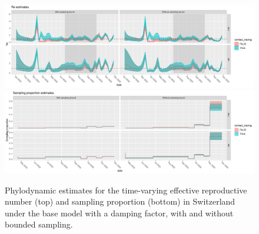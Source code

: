 \documentclass[9pt,twoside,lineno]{pnas-new}
\begin{document}
\begin{figure}[tbhp]
\centering
\includegraphics[width=\linewidth]{figures/bdsky_2021-08-18/Re_CHE_1deme.pdf}
\vfill
\includegraphics[width=\linewidth]{figures/bdsky_2021-08-18/sampProp_CHE_1deme.pdf}
\caption{Phylodynamic estimates for the time-varying effective reproductive number (top) and sampling proportion (bottom) in Switzerland under the base model with a damping factor, with and without bounded sampling.}  
\label{fig:1DemeCHResults}
\end{figure}
\end{document}
